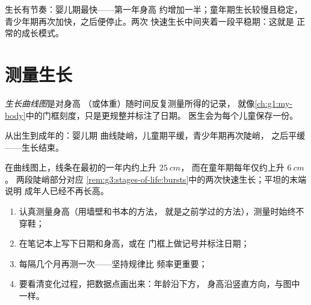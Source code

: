 \begin{remark}[生长并不均匀]\label{rem:g3:stages-of-life:bursts}
生长有节奏：婴儿期最快——第一年身高
约增加一半；童年期生长较慢且稳定，
青少年期再次加快，之后便停止。两次
快速生长中间夹着一段平稳期：这就是
正常的成长模式。
\end{remark}

\section{测量生长}

\begin{definition}[生长曲线图]\label{def:g3:stages-of-life:chart}
\emph{生长曲线图}是对身高
（或体重）随时间反复测量所得的记录，
就像\cref{ch:g1:my-body}中的门框刻度，只是更规整并标注了日期。
医生会为每个儿童保存一份。
\end{definition}

\begin{omfigure}

{\small 从出生到成年的：婴儿期
曲线陡峭，儿童期平缓，青少年期再次陡峭，
之后平缓——生长结束。}
\end{omfigure}

\begin{example}[读懂曲线图]\label{ex:g3:stages-of-life:reading}
在曲线图上，线条在最初的一年内约上升 $\qty{25}{cm}$，
而在童年期每年仅约上升 $\qty{6}{cm}$ 。
两段陡峭部分对应
\cref{rem:g3:stages-of-life:bursts}中的两次快速生长；平坦的末端说明
成年人已经不再长高。
\end{example}

\begin{method}[记录你自己的生长曲线]\label{met:g3:stages-of-life:keep}
\begin{enumerate}
  \item 认真测量身高（用墙壁和书本的方法，
        就是之前学过的方法），测量时始终不穿鞋；
  \item 在笔记本上写下日期和身高，或在
        门框上做记号并标注日期；
  \item 每隔几个月再测一次——坚持规律比
        频率更重要；
  \item 要看清变化过程，把数据点画出来：年龄沿下方，
        身高沿竖直方向，与图中一样。
\end{enumerate}
\end{method}

